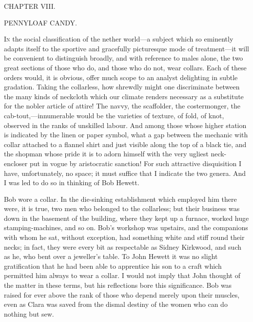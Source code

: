 {}

{CHAPTER VIII.}

PENNYLOAF CANDY.

\textsc{In} the social classification of the nether world---a subject
which so eminently adapts itself to the sportive and gracefully
picturesque mode of treatment---it will be convenient to distinguish
broadly, and with reference to males alone, the two great sections of
those who do, and those who do not, wear collars. Each of these orders
would, it is obvious, offer much scope to an analyst delighting in
subtle gradation. Taking the collarless, how shrewdly might one
discriminate between the many kinds of neckcloth which our climate
renders necessary as a substitute for the nobler article of attire! The
navvy, the scaffolder, the costermonger, the cab-tout,---innumerable
would be the varieties of texture, of fold, of knot, observed in the
ranks of {}unskilled labour. And among those whose higher station is
indicated by the linen or paper symbol, what a gap between the mechanic
with collar attached to a flannel shirt and just visible along the top
of a black tie, and the shopman whose pride it is to adorn himself with
the very ugliest neck-encloser put in vogue by aristocratic sanction!
For such attractive disquisition I have, unfortunately, no space; it
must suffice that I indicate the two genera. And I was led to do so in
thinking of Bob Hewett.

Bob wore a collar. In the die-sinking establishment which employed him
there were, it is true, two men who belonged to the collarless; but
their business was down in the basement of the building, where they kept
up a furnace, worked huge stamping-machines, and so on. Bob's workshop
was upstairs, and the companions with whom he sat, without exception,
had something white and stiff round their necks; in fact, they were
every bit as respectable as Sidney Kirkwood, and such as he, who bent
over a {}jeweller's table. To John Hewett it was no slight gratification
that he had been able to apprentice his son to a craft which permitted
him always to wear a collar. I would not imply that John thought of the
matter in these terms, but his reflections bore this significance. Bob
was raised for ever above the rank of those who depend merely upon their
muscles, even as Clara was saved from the dismal destiny of the women
who can do nothing but sew.

